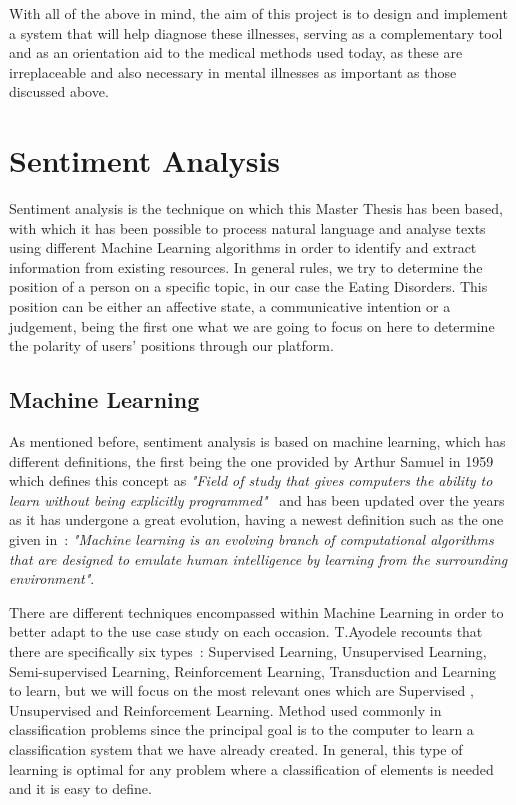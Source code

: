 With all of the above in mind, the aim of this project is to design and implement a system that will help diagnose these illnesses, serving as a complementary tool and as an orientation aid to the medical methods used today, as these are irreplaceable and also necessary in mental illnesses as important as those discussed above.



\section{Sentiment Analysis}
Sentiment analysis is the technique on which this Master Thesis has been based, with which it has been possible to process natural language and analyse texts using different Machine Learning algorithms in order to identify and extract information from existing resources. In general rules, we try to determine the position of a person on a specific topic, in our case the Eating Disorders. This position can be either an affective state, a communicative intention or a judgement, being the first one what we are going to focus on here to determine the polarity of users' positions through our platform. 

\subsection{Machine Learning}
As mentioned before, sentiment analysis is based on machine learning, which has different definitions, the first being the one provided by Arthur Samuel in 1959 which defines this concept as \textit{"Field of study that gives computers the ability to learn without being explicitly programmed"}~\cite{samuel1959some} and has been updated over the years as it has undergone a great evolution, having a newest definition such as the one given in~\cite{el2015machine}: \textit{"Machine learning is an evolving branch of computational algorithms that are designed to emulate human intelligence by learning from the surrounding environment"}.

There are different techniques encompassed within Machine Learning in order to better adapt to the use case study on each occasion. T.Ayodele recounts that there are specifically six types~\cite{ayodele2010types}: Supervised Learning, Unsupervised Learning, Semi-supervised Learning,  Reinforcement Learning, Transduction and Learning to learn, but we will focus on the most relevant ones which are Supervised , Unsupervised and Reinforcement Learning.
Method used commonly in classification problems since the principal goal is to the computer to learn a classification system that we have already created. In general, this type of learning is optimal for any problem where a classification of elements is needed and it is easy to define. 

